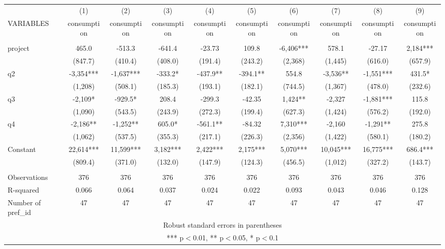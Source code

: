 \documentclass[]{article}
\begin{document}
\begin{tabular}{lccccccccc} \hline
 & (1) & (2) & (3) & (4) & (5) & (6) & (7) & (8) & (9) \\
VARIABLES & consumption & consumption & consumption & consumption & consumption & consumption & consumption & consumption & consumption \\ \hline
 &  &  &  &  &  &  &  &  &  \\
project & 465.0 & -513.3 & -641.4 & -23.73 & 109.8 & -6,406*** & 578.1 & -27.17 & 2,184*** \\
 & (847.7) & (410.4) & (408.0) & (191.4) & (243.2) & (2,368) & (1,445) & (616.0) & (657.9) \\
q2 & -3,354*** & -1,637*** & -333.2* & -437.9** & -394.1** & 554.8 & -3,536** & -1,551*** & 431.5* \\
 & (1,208) & (508.1) & (185.3) & (193.1) & (182.1) & (744.5) & (1,367) & (478.0) & (232.6) \\
q3 & -2,109* & -929.5* & 208.4 & -299.3 & -42.35 & 1,424** & -2,327 & -1,881*** & 115.8 \\
 & (1,090) & (543.5) & (243.9) & (272.3) & (199.4) & (627.3) & (1,424) & (576.2) & (192.0) \\
q4 & -2,186** & -1,252** & 605.0* & -561.1** & -84.32 & 7,310*** & -2,160 & -1,291** & 275.8 \\
 & (1,062) & (537.5) & (355.3) & (217.1) & (226.3) & (2,356) & (1,422) & (580.1) & (180.2) \\
Constant & 22,614*** & 11,599*** & 3,182*** & 2,422*** & 2,175*** & 5,070*** & 10,045*** & 16,775*** & 686.4*** \\
 & (809.4) & (371.0) & (132.0) & (147.9) & (124.3) & (456.5) & (1,012) & (327.2) & (143.7) \\
 &  &  &  &  &  &  &  &  &  \\
Observations & 376 & 376 & 376 & 376 & 376 & 376 & 376 & 376 & 376 \\
R-squared & 0.066 & 0.064 & 0.037 & 0.024 & 0.022 & 0.093 & 0.043 & 0.046 & 0.128 \\
 Number of pref\_id & 47 & 47 & 47 & 47 & 47 & 47 & 47 & 47 & 47 \\ \hline
\multicolumn{10}{c}{ Robust standard errors in parentheses} \\
\multicolumn{10}{c}{ *** p$<$0.01, ** p$<$0.05, * p$<$0.1} \\
\end{tabular}
\end{document}
